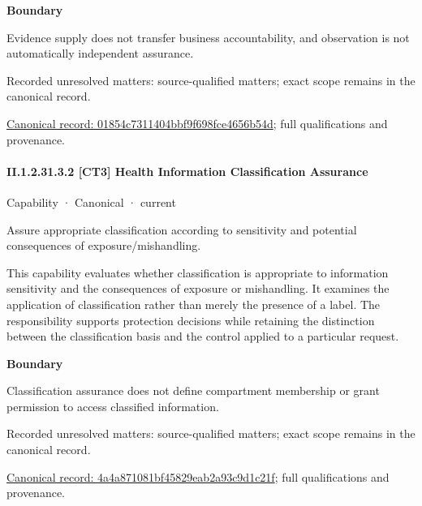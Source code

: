 \textbf{Boundary}



Evidence supply does not transfer business accountability, and observation is not automatically independent assurance.


{\small Recorded unresolved matters: source-qualified matters; exact scope remains in the canonical record.}\par
{\footnotesize \href{../../../../continuum/strategy/capability/01854c7311404bbf9f698fce4656b54d.md}{Canonical record: 01854c7311404bbf9f698fce4656b54d}; full qualifications and provenance.}\par
\paragraph*{II.1.2.31.3.2 [CT3] Health Information Classification Assurance}
\label{navigation:II.1.2.31.3.2}

\label{element:4a4a871081bf45829eab2a93c9d1c21f}
{\small Capability · Canonical · current}\par

Assure appropriate classification according to sensitivity and potential consequences of exposure/mishandling.



This capability evaluates whether classification is appropriate to information sensitivity and the consequences of exposure or mishandling. It examines the application of classification rather than merely the presence of a label. The responsibility supports protection decisions while retaining the distinction between the classification basis and the control applied to a particular request.



\textbf{Boundary}



Classification assurance does not define compartment membership or grant permission to access classified information.


{\small Recorded unresolved matters: source-qualified matters; exact scope remains in the canonical record.}\par
{\footnotesize \href{../../../../continuum/strategy/capability/4a4a871081bf45829eab2a93c9d1c21f.md}{Canonical record: 4a4a871081bf45829eab2a93c9d1c21f}; full qualifications and provenance.}\par
